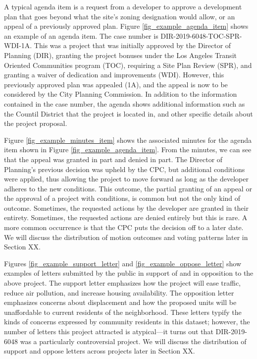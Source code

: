 A typical agenda item is a request from a developer to approve a development plan that goes beyond what the site's zoning designation would allow, or an appeal of a previously approved plan. Figure \ref{fig_example_agenda_item} shows an example of an agenda item. The case number is DIR-2019-6048-TOC-SPR-WDI-1A. This was a project that was initially approved by the Director of Planning (DIR), granting the project bonuses under the Los Angeles Transit Oriented Communities program (TOC), requiring a Site Plan Review (SPR), and granting a waiver of dedication and improvements (WDI). However, this previously approved plan was appealed (1A), and the appeal is now to be considered by the City Planning Commission. In addition to the information contained in the case number, the agenda shows additional information such as the Countil District that the project is located in, and other specific details about the project proposal.

Figure \ref{fig_example_minutes_item} shows the associated minutes for the agenda item shown in Figure \ref{fig_example_agenda_item}. From the minutes, we can see that the appeal was granted in part and denied in part. The Director of Planning's previous decision was upheld by the CPC, but additional conditions were applied, thus allowing the project to move forward as long as the developer adheres to the new conditions. This outcome, the partial granting of an appeal or the approval of a project with conditions, is common but not the only kind of outcome. Sometimes, the requested actions by the developer are granted in their entirety. Sometimes, the requested actions are denied entirely but this is rare. A more common occurrence is that the CPC puts the decision off to a later date. We will discuss the distribution of motion outcomes and voting patterns later in Section XX.

Figures \ref{fig_example_support_letter} and \ref{fig_example_oppose_letter} show examples of letters submitted by the public in support of and in opposition to the above project. The support letter emphasizes how the project will ease traffic, reduce air pollution, and increase housing availability. The opposition letter emphasizes concerns about displacement and how the proposed units will be unaffordable to current residents of the neighborhood. These letters typify the kinds of concerns expressed by community residents in this dataset; however, the number of letters this project attracted is atypical---it turns out that DIR-2019-6048 was a particularly controversial project. We will discuss the distribution of support and oppose letters across projects later in Section XX.

